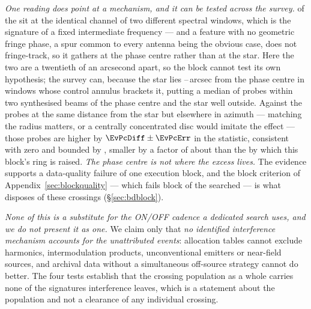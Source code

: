 \emph{One reading does point at a mechanism, and it can be tested across the
survey.} \DqBlockIfMult{} of the \DqBlockNCross{} sit at the identical
channel of two different spectral windows, which is the signature of a fixed
intermediate frequency --- and a feature with no geometric fringe phase, a
spur common to every antenna being the obvious case, does not fringe-track,
so it gathers at the phase centre rather than at the star. Here the two are a
twentieth of an arcsecond apart, so the block cannot test its own hypothesis;
the survey can, because the star lies \EvPcOffLo--\EvPcOffHi\,arcsec from the
phase centre in \EvPcNWin{} windows whose control annulus brackets it,
putting a median of \EvPcNNear{} probes within two synthesised beams of the
phase centre and the star well outside. Against the probes at the same
distance from the star but elsewhere in azimuth --- matching the radius
matters, or a centrally concentrated disc would imitate the effect --- those
probes are higher by $\EvPcDiff\pm\EvPcErr$ in the statistic, consistent with
zero and bounded by \EvPcBound, smaller by a factor of about \EvPcFactor{}
than the \EvPcNeed{} by which this block's ring is raised. \emph{The phase
centre is not where the excess lives.} The evidence supports a data-quality
failure of one execution block, and the block criterion of
Appendix~\ref{sec:blockquality} --- which fails \BqNFail{} block of the
\BqNBlocks{} searched --- is what disposes of these \EvNCrossFlag{} crossings
(\S\ref{sec:bdblock}).

\emph{None of this is a substitute for the ON/OFF cadence a dedicated search
uses, and we do not present it as one.} We claim only that \emph{no
identified interference mechanism accounts for the unattributed events}:
allocation tables cannot exclude harmonics, intermodulation products,
unconventional emitters or near-field sources, and archival data without a
simultaneous off-source strategy cannot do better. The four tests establish
that the crossing population as a whole carries none of the signatures
interference leaves, which is a statement about the population and not a
clearance of any individual crossing.

